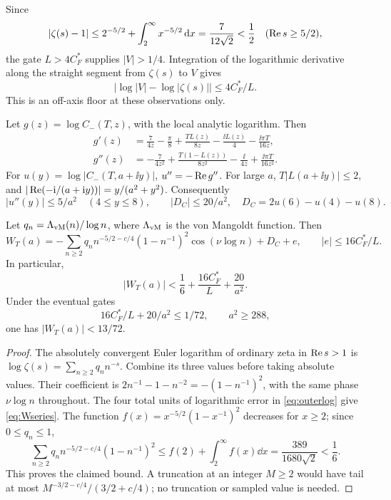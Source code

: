Since
\[
 |\zeta(s)-1|\le 2^{-5/2}+\int_2^\infty x^{-5/2}\,\mathrm d x
               =\frac7{12\sqrt2}<\frac12
 \quad(\operatorname{Re} s\ge5/2),
\]
the gate \(L>4C_F^*\) supplies \(|V|>1/4\). Integration of the
logarithmic derivative along the straight segment from \(\zeta(s)\) to
\(V\) gives
\begin{equation}\label{eq:outerlog}
 \bigl|\log|V|-\log|\zeta(s)|\bigr|\le4C_F^*/L.
\end{equation}
This is an off-axis floor at these observations only.

Let \(g(z)=\log C_-(T,z)\), with the local analytic logarithm. Then
\begin{align}
 g'(z)&=\frac7{4z}-\frac\pi8+\frac{TL(z)}{8z}
              -\frac{\ii L(z)}4-\frac{\ii\pi T}{16z},\label{eq:gprime}\\
 g''(z)&=-\frac7{4z^2}+\frac{T(1-L(z))}{8z^2}
              -\frac\ii{4z}+\frac{\ii\pi T}{16z^2}.
\end{align}
For \(u(y)=\log|C_-(T,a+\ii y)|\), \(u''=-\operatorname{Re} g''\).
For large \(a\), \(T|L(a+\ii y)|\le2\), and
\(|\operatorname{Re}(-\mathrm i/(a+\mathrm i y))|=y/(a^2+y^2)\). Consequently
\[
 |u''(y)|\le5/a^2\quad(4\le y\le8),\qquad
 |D_C|\le20/a^2,\quad D_C=2u(6)-u(4)-u(8).
\]

\begin{proposition}\label{prop:W}
Let \(q_n=\Lambda_{\mathrm{vM}}(n)/\log n\), where \(\Lambda_{\mathrm{vM}}\) is the
von Mangoldt function. Then
\begin{equation}\label{eq:Wseries}
 W_T(a)=-\sum_{n\ge2}q_n n^{-5/2-c/4}(1-n^{-1})^2
                    \cos(\nu\log n)+D_C+e,\qquad
 |e|\le16C_F^*/L.
\end{equation}
In particular,
\begin{equation}\label{eq:Wbound}
 |W_T(a)|<\frac16+\frac{16C_F^*}{L}+\frac{20}{a^2}.
\end{equation}
Under the eventual gates
\begin{equation}\label{eq:Wgates}
 16C_F^*/L+20/a^2\le1/72,\qquad a^2\ge288,
\end{equation}
one has \(|W_T(a)|<13/72\).
\end{proposition}
\begin{proof}
The absolutely convergent Euler logarithm of ordinary zeta in
\(\operatorname{Re} s>1\) \cite{dlmfzeta} is
\(\log\zeta(s)=\sum_{n\ge2}q_n n^{-s}\).
Combine its three values before taking absolute values. Their
coefficient is \(2n^{-1}-1-n^{-2}=-(1-n^{-1})^2\), with the same
phase \(\nu\log n\) throughout. The four total units of logarithmic
error in \eqref{eq:outerlog} give \eqref{eq:Wseries}.
The function \(f(x)=x^{-5/2}(1-x^{-1})^2\) decreases for \(x\ge2\);
since \(0\le q_n\le1\),
\[
 \sum_{n\ge2}q_n n^{-5/2-c/4}(1-n^{-1})^2
 \le f(2)+\int_2^\infty f(x)\dd x
 =\frac{389}{1680\sqrt2}<\frac16.
\]
This proves the claimed bound. A truncation at an integer \(M\ge2\)
would have tail at most
\(M^{-3/2-c/4}/(3/2+c/4)\); no truncation or sampled value is needed.
\end{proof}

